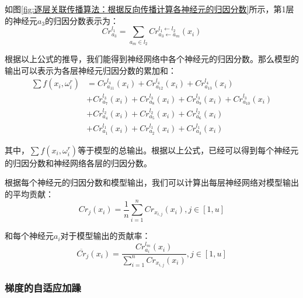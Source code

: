 如图\ref{fig:逐层关联传播算法：根据反向传播计算各神经元的归因分数}所示，第1层的神经元$a_{3}$的归因分数表示为：
$$
C r_{a_{3}}^{l_{1}}=\sum_{a_{m} \in l_{2}} Cr_{a_{3} \leftarrow a_{m}}^{l_{1} \leftarrow l_{2}}\left(x_{i}\right)
$$

根据以上公式的推导，我们能得到神经网络中各个神经元的归因分数。那么模型的输出可以表示为各层神经元归因分数的累加和：
$$
\begin{aligned}
\sum f\left(x_{i}, \omega_{i}^{r}\right) &=Cr_{a_{11}}^{l_{4}}\left(x_{i}\right)+Cr_{a_{12}}^{l_{4}}\left(x_{i}\right)+Cr_{a_{13}}^{l_{4}}\left(x_{i}\right)\\
&+Cr_{a_{7}}^{l_{3}}\left(x_{i}\right)+Cr_{a_{8}}^{l_{3}}\left(x_{i}\right)+Cr_{a_{9}}^{l_{3}}\left(x_{i}\right)+Cr_{a_{10}}^{l_{3}}\left(x_{i}\right)\\
&+Cr_{a_{4}}^{l_{2}}\left(x_{i}\right)+Cr_{a_{5}}^{l_{2}}\left(x_{i}\right)+Cr_{a_{6}}^{l_{2}}\left(x_{i}\right)\\
&+Cr_{a_{1}}^{l_{1}}\left(x_{i}\right)+Cr_{a_{2}}^{l_{1}}\left(x_{i}\right)+Cr_{a_{3}}^{l_{1}}\left(x_{i}\right)
\end{aligned}
$$

其中，$\sum f\left(x_{i}, \omega_{i}^{r}\right)$等于模型的总输出。根据以上公式，已经可以得到每个神经元的归因分数和神经网络各层的归因分数。

根据每个神经元的归因分数和模型输出，我们可以计算出每层神经网络对模型输出的平均贡献：
\begin{equation}\label{eq:属性添加自适应扰动}
Cr_{j}\left(x_{i}\right)=\frac{1}{n} \sum_{i=1}^{n} Cr_{x_{i, j}}\left(x_{i}\right), j \in[1, u]
\end{equation}

和每个神经元$a_{i}$对于模型输出的贡献率：
\begin{equation}\label{eq:属性添加自适应扰动}
\ddot{Cr_{j}}\left(x_{i}\right)=\frac{Cr_{a_{i}}^{l_{m}}\left(x_{i}\right)}{\sum_{i=1}^{n} Cr_{x_{i, j}}\left(x_{i}\right)}, j \in[1, u]
\end{equation}

\subsubsection{梯度的自适应加躁}

